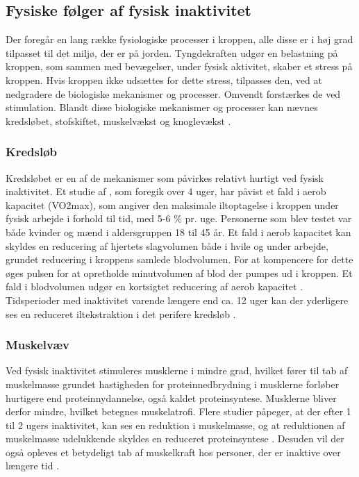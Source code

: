 \subsection{Fysiske følger af fysisk inaktivitet}\label{sec:FoeglerAfFiA}
Der foregår en lang række fysiologiske processer i kroppen, alle disse er i høj grad tilpasset til det miljø, der er på jorden. 
Tyngdekraften udgør en belastning på kroppen, som sammen med bevægelser, under fysisk aktivitet, skaber et stress på kroppen. 
Hvis kroppen ikke udsættes for dette stress, tilpasses den, ved at nedgradere de biologiske mekanismer og processer. Omvendt forstærkes de ved stimulation. 
Blandt disse biologiske mekanismer og processer kan nævnes kredsløbet, stofskiftet, muskelvækst og knoglevækst \citep{motionsraad2007}.

\subsubsection{Kredsløb}
Kredsløbet er en af de mekanismer som påvirkes relativt hurtigt ved fysisk inaktivitet. 
Et studie af \citeauthor{Convertino1995}, som foregik over 4 uger, har påvist et fald i aerob kapacitet (VO2max), som angiver den maksimale iltoptagelse i kroppen under fysisk arbejde i forhold til tid, med 5-6 \% pr. uge. 
Personerne som blev testet var både kvinder og mænd i aldersgruppen 18 til 45 år. 
Et fald i aerob kapacitet kan skyldes en reducering af hjertets slagvolumen både i hvile og under arbejde, grundet reducering i kroppens samlede blodvolumen. 
For at kompencere for dette øges pulsen for at opretholde minutvolumen af blod der pumpes ud i kroppen. 
Et fald i blodvolumen udgør en kortsigtet reducering af aerob kapacitet \citep{Convertino1995}. 
Tidsperioder med inaktivitet varende længere end ca. 12 uger kan der yderligere ses en reduceret iltekstraktion i det perifere kredsløb \citep{Coyle1985}.

\subsubsection{Muskelvæv}
Ved fysisk inaktivitet stimuleres musklerne i mindre grad, hvilket fører til tab af muskelmasse grundet hastigheden for proteinnedbrydning i musklerne forløber hurtigere end proteinnydannelse, også kaldet proteinsyntese. 
Musklerne bliver derfor mindre, hvilket betegnes muskelatrofi. 
Flere studier påpeger, at der efter 1 til 2 ugers inaktivitet, kan ses en reduktion i muskelmasse, og at reduktionen af muskelmasse udelukkende skyldes en reduceret proteinsyntese \citep{Douglas2006, Bloomfield1995}. 
Desuden vil der også opleves et betydeligt tab af muskelkraft hos personer, der er inaktive over længere tid \citep{Bloomfield1995}. 

